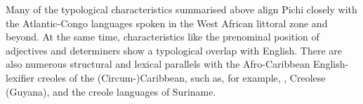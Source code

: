 Many of the typological characteristics summarised above align Pichi closely with the Atlantic-Congo languages spoken in the West African littoral zone and beyond. At the same time, characteristics like the prenominal position of adjectives and determiners show a typological overlap with English. There are also numerous structural and lexical parallels with the Afro-Caribbean English-lexifier creoles of the (Circum-)Caribbean, such as, for example, , Creolese (Guyana), and the creole languages of Suriname.

